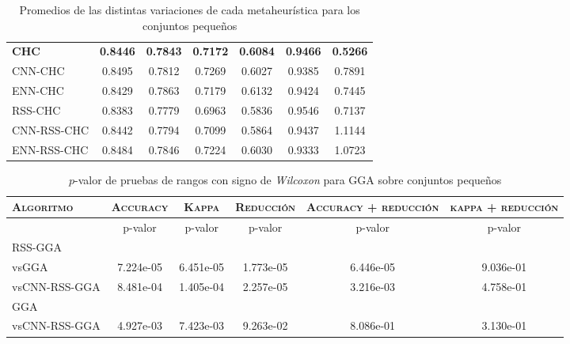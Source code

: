 \begin{table}[h!]
\begin{tabular}{l c c c c c c}
\hline

\textbf{CHC} & \textbf{0.8446} & \textbf{0.7843} & \textbf{0.7172} & \textbf{0.6084} & \textbf{0.9466} & \textbf{0.5266} \\
CNN-CHC & 0.8495 & 0.7812 & 0.7269 & 0.6027 & 0.9385 & 0.7891 \\
ENN-CHC & 0.8429 & 0.7863 & 0.7179 & 0.6132 & 0.9424 & 0.7445 \\
RSS-CHC & 0.8383 & 0.7779 & 0.6963 & 0.5836 & 0.9546 & 0.7137 \\
CNN-RSS-CHC  & 0.8442 & 0.7794 & 0.7099 & 0.5864 & 0.9437 & 1.1144 \\
ENN-RSS-CHC & 0.8484 & 0.7846 & 0.7224 & 0.6030 & 0.9333 & 1.0723 \\

\hline
\end{tabular}
\caption{Promedios de las distintas variaciones de cada metaheurística para los conjuntos pequeños}
\label{peq-all}
\end{table}


\begin{table}[h!]
\centering
\begin{adjustbox}{max width =\textwidth}
\begin{tabular}{l c c c c c}
\hline
	\textsc{Algoritmo}
	& \multicolumn{1}{c}{\textsc{Accuracy}}
	& \multicolumn{1}{c}{\textsc{Kappa}}
	& \multicolumn{1}{c}{\textsc{Reducción}} 
	& \multicolumn{1}{c}{\textsc{Accuracy + reducción}} 
	& \multicolumn{1}{c}{\textsc{kappa + reducción}} \\
\hline
\hline

 & p-valor & p-valor & p-valor & p-valor & p-valor \\

RSS-GGA\\
vsGGA & 7.224e-05 & 6.451e-05 & 1.773e-05 & 6.446e-05 & 9.036e-01 \\ 
vsCNN-RSS-GGA & 8.481e-04 & 1.405e-04 & 2.257e-05 & 3.216e-03 & 4.758e-01 \\ 

\hline 

GGA\\
vsCNN-RSS-GGA & 4.927e-03 & 7.423e-03 & 9.263e-02 & 8.086e-01 & 3.130e-01 \\ 

\hline

\end{tabular}
\end{adjustbox}
\caption[Pruebas de \emph{Wilcoxon} entre GGA y variaciones para conjuntos pequeños]{$p$-valor de pruebas de rangos con signo de \emph{Wilcoxon} para GGA sobre conjuntos pequeños}
\label{wilcox-gga-peq}
\end{table}

